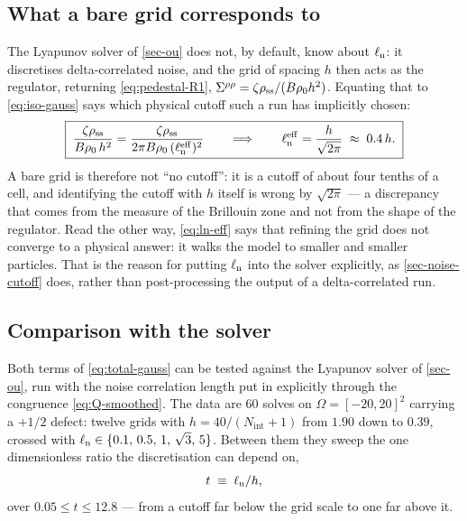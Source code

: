 \documentclass[a5paper]{article}
\begin{document}
\subsection{What a bare grid corresponds to}
\label{sec-ln-vs-h}

The Lyapunov solver of \cref{sec-ou} does not, by default, know about $\elln$: it discretises delta-correlated noise, and the grid of spacing $h$ then acts as the regulator, returning \eqref{eq:pedestal-R1}, $\Sigma^{\rho\rho} = \zeta\rho_\ss/(B\rho_0h^2)$. Equating that to \eqref{eq:iso-gauss} says which physical cutoff such a run has implicitly chosen:
\begin{equation}
    \label{eq:ln-eff}
    \boxed{\;\frac{\zeta\rho_\ss}{B\rho_0\,h^2} = \frac{\zeta\rho_\ss}{2\pi B\rho_0\,(\elln^\mathrm{eff})^2}
    \qquad\Longrightarrow\qquad
    \elln^\mathrm{eff} = \frac{h}{\sqrt{2\pi}}\;\approx\;0.4\,h.\;}
\end{equation}
A bare grid is therefore not ``no cutoff'': it is a cutoff of about four tenths of a cell, and identifying the cutoff with $h$ itself is wrong by $\sqrt{2\pi}$ --- a discrepancy that comes from the measure of the Brillouin zone and not from the shape of the regulator. Read the other way, \eqref{eq:ln-eff} says that refining the grid does not converge to a physical answer: it walks the model to smaller and smaller particles. That is the reason for putting $\elln$ into the solver explicitly, as \cref{sec-noise-cutoff} does, rather than post-processing the output of a delta-correlated run.

\subsection{Comparison with the solver}
\label{sec-cutoff-numerics}

Both terms of \eqref{eq:total-gauss} can be tested against the Lyapunov solver of \cref{sec-ou}, run with the noise correlation length put in explicitly through the congruence \eqref{eq:Q-smoothed}. The data are $60$ solves on $\Omega = [-20,20]^2$ carrying a $+1/2$ defect: twelve grids with $h = 40/(N_\mathrm{int}+1)$ from $1.90$ down to $0.39$, crossed with $\elln\in\{0.1,\,0.5,\,1,\,\sqrt3,\,5\}$. Between them they sweep the one dimensionless ratio the discretisation can depend on,
\begin{equation}
    \label{eq:t-def}
    t \;\equiv\; \elln/h,
\end{equation}
over $0.05\le t\le12.8$ --- from a cutoff far below the grid scale to one far above it.
\end{document}
